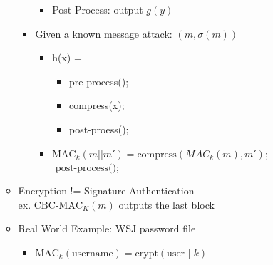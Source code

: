 \begin{itemize}
\begin{itemize}
\begin{itemize}
\begin{itemize}
            \item Post-Process: output $g(y)$  
            \end{itemize}  
        \item Given a known message attack: $(m, \sigma(m))$
            \begin{itemize}
            \item h(x) = 
                \begin{itemize}
                \item pre-process();
                \item compress(x);
                \item post-proess();
                \end{itemize}
            \item $\text{MAC}_k(m||m') = \text{compress}(MAC_k(m),m');$
                \\$\text{                post-process()}$;
            \end{itemize}
    \end{itemize}  
    \item Encryption != Signature Authentication
        \\ex. $\text{CBC-MAC}_K(m)$ outputs the last block
    \item Real World Example: WSJ password file  
        \begin{itemize}
        \item $\text{MAC}_k(\text{username}) = \text{crypt}(\text{user }||k)$
        \end{itemize}
    \end{itemize}
\end{itemize}